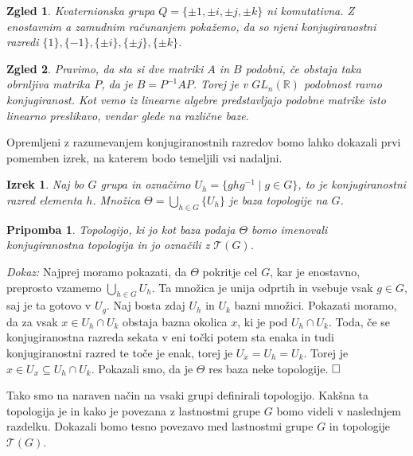 \documentclass[a4paper,12pt]{article}
\def\R{\mathbb{R}} %
\def\qed{$\hfill\Box$}   %
\newtheorem{izrek}{Izrek}
\newtheorem{pripomba}{Pripomba}
\newtheorem{zgled}{Zgled}
\begin{document}
\begin{zgled}
    Kvaternionska grupa $Q = \{\pm 1, \pm i, \pm j, \pm k\}$ ni komutativna. Z enostavnim a zamudnim računanjem pokažemo,
    da so njeni konjugiranostni razredi $\{1\}, \{-1\}, \{\pm i\}, \{\pm j\}, \{\pm k\}$. 
\end{zgled}

\begin{zgled}
    Pravimo, da sta si dve matriki $A$ in $B$ podobni, če obstaja taka obrnljiva matrika $P$, da je $B = P^{-1}AP$.
    Torej je v $GL_n(\R)$ podobnost ravno konjugiranost. Kot vemo iz linearne algebre predstavljajo podobne matrike isto linearno preslikavo,
    vendar glede na različne baze.
\end{zgled}

Opremljeni z razumevanjem konjugiranostnih razredov bomo lahko dokazali prvi pomemben izrek, na katerem bodo temeljili vsi nadaljni.

\begin{izrek}
    Naj bo $G$ grupa in označimo $U_h = \{ghg^{-1} \mid g \in G \}$, to je konjugiranostni razred elementa $h$.
    Množica $\Theta = \bigcup_{h \in G}\{U_h\}$ je baza topologije na $G$.
\end{izrek}

\begin{pripomba}
    Topologijo, ki jo kot baza podaja $\Theta$ bomo imenovali \emph{konjugiranostna topologija} in jo označili z $\mathcal{T}(G)$.
\end{pripomba}


\noindent
{\em Dokaz:\/}
    Najprej moramo pokazati, da $\Theta$ pokritje cel $G$, kar je enostavno, preprosto vzamemo $\bigcup_{h \in G}U_h$.
    Ta množica je unija odprtih in vsebuje vsak $g \in G$, saj je ta gotovo v $U_g$.
    Naj bosta zdaj  $U_h$ in $U_k$ bazni množici. Pokazati moramo, da za vsak $x \in U_h \cap U_k$ obstaja bazna okolica $x$, ki je pod $U_h \cap U_k$.
    Toda, če se konjugiranostna razreda sekata v eni točki potem sta enaka in tudi konjugiranostni razred te toče je enak, torej je $U_x = U_h = U_k$.
    Torej je $x \in U_x \subseteq U_h \cap U_k$. Pokazali smo, da je $\Theta$ res baza neke topologije.
\qed

Tako smo na naraven način na vsaki grupi definirali topologijo.
Kakšna ta topologija je in kako je povezana z lastnostmi grupe $G$ bomo videli v naslednjem razdelku.
Dokazali bomo tesno povezavo med lastnostmi grupe $G$ in topologije $\mathcal{T}(G)$.
\end{document}
